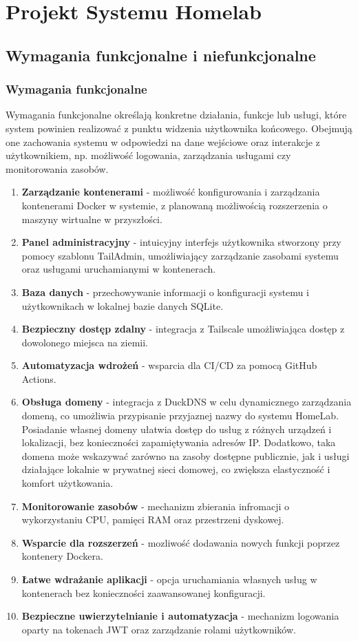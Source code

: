 \chapter{Projekt Systemu Homelab}

\section{Wymagania funkcjonalne i niefunkcjonalne}

\subsection{Wymagania funkcjonalne}

Wymagania funkcjonalne określają konkretne działania, funkcje lub usługi, które system powinien realizować z punktu widzenia użytkownika końcowego. Obejmują one zachowania systemu w odpowiedzi na dane wejściowe oraz interakcje z użytkownikiem, np. możliwość logowania, zarządzania usługami czy monitorowania zasobów.

\begin{enumerate}
    \item \textbf{Zarządzanie kontenerami} - możliwość konfigurowania i zarządzania kontenerami Docker w systemie, z planowaną możliwością rozszerzenia o maszyny wirtualne w przyszłości.
    \item \textbf{Panel administracyjny} - intuicyjny interfejs użytkownika stworzony przy pomocy szablonu TailAdmin\cite{TailAdmin}, umożliwiający zarządzanie zasobami systemu oraz usługami uruchamianymi w kontenerach.
    \item \textbf{Baza danych} - przechowywanie informacji o konfiguracji systemu i użytkownikach w lokalnej bazie danych SQLite.
    \item \textbf{Bezpieczny dostęp zdalny} - integracja z Tailscale umożliwiająca dostęp z dowolonego miejsca na ziemii.
    \item \textbf{Automatyzacja wdrożeń} - wsparcia dla CI/CD za pomocą GitHub Actions.
    \item \textbf{Obsługa domeny} - integracja z DuckDNS w celu dynamicznego zarządzania domeną, co umożliwia przypisanie przyjaznej nazwy do systemu HomeLab. Posiadanie własnej domeny ułatwia dostęp do usług z różnych urządzeń i lokalizacji, bez konieczności zapamiętywania adresów IP. Dodatkowo, taka domena może wskazywać zarówno na zasoby dostępne publicznie, jak i usługi działające lokalnie w prywatnej sieci domowej, co zwiększa elastyczność i komfort użytkowania.
    \item \textbf{Monitorowanie zasobów} - mechanizm zbierania infromacji o wykorzystaniu CPU, pamięci RAM oraz przestrzeni dyskowej.
    \item \textbf{Wsparcie dla rozszerzeń} - mozliwość dodawania nowych funkcji poprzez kontenery Dockera.
    \item \textbf{Łatwe wdrażanie aplikacji} - opcja uruchamiania własnych usług w kontenerach bez konieczności zaawansowanej konfiguracji.
\item \textbf{Bezpieczne uwierzytelnianie i automatyzacja} - mechanizm logowania oparty na tokenach JWT oraz zarządzanie rolami użytkowników.
\end{enumerate}

